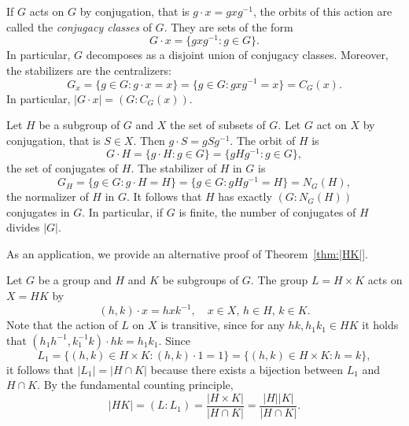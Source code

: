 \begin{example}
    If $G$ acts on $G$ by conjugation, that is $g\cdot x=gxg^{-1}$, the orbits of this action are called the \emph{conjugacy classes} 
    of $G$. They are sets of the form
        \[
        G\cdot x=\{gxg^{-1}:g\in G\}.
        \]
    In particular, $G$ decomposes as a disjoint union of conjugacy classes. Moreover, 
    the stabilizers are the centralizers:
        \[
        G_x=\{g\in G:g\cdot x=x\}=\{g\in G:gxg^{-1}=x\}=C_G(x).
        \]
    In particular, $|G\cdot x|=(G:C_G(x))$.
\end{example}

\begin{example}
\label{xca:counting_conjugates}
    Let $H$ be a subgroup of $G$ and $X$ the set of subsets of $G$. Let $G$ act on 
    $X$ by conjugation, that is $S\in X$. Then
        $g\cdot S=gSg^{-1}$. The orbit of $H$ 
        is 
        \[
        G\cdot H=\{g\cdot H:g\in G\}=\{gHg^{-1}:g\in G\},
        \]
        the set of conjugates of $H$. The stabilizer of $H$ in $G$ 
        is 
        \[
        G_H=\{g\in G:g\cdot H=H\}=\{g\in G:gHg^{-1}=H\}=N_G(H),
        \]
        the normalizer of $H$ in $G$. It follows that
        $H$ has exactly $(G:N_G(H))$ conjugates in $G$. In particular,
        if $G$ is finite, 
        the number of conjugates of $H$ divides $|G|$. 
\end{example}

As an application, we provide an alternative proof
of Theorem~\ref{thm:|HK|}. 

\begin{example}
\label{exa:for_HK}
Let $G$ be a group and $H$ and $K$ be subgroups of $G$. 
The group $L=H\times K$ acts on $X=HK$ by 
\[
(h,k)\cdot x=hxk^{-1},\quad x\in X,\,h\in H,\,k\in K.
\]
Note that the action of $L$ on $X$ is transitive, since for any $hk, h_1k_1\in HK$ it holds that $(h_1h^{-1}, k_1^{-1}k)\cdot hk = h_1k_1$.
Since 
\[
L_1=\{(h,k)\in H\times K: (h,k)\cdot 1=1\}=\{(h,k)\in H\times K:h=k\},
\]
it follows that $|L_1|=|H\cap K|$ because there exists a bijection
between $L_1$ and 
$H\cap K$. By the fundamental counting principle, 
\[
|HK|=(L:L_1)=\frac{|H\times K|}{|H\cap K|}=\frac{|H||K|}{|H\cap K|}.
\]
\end{example}
